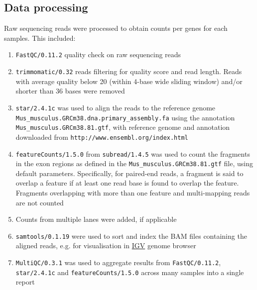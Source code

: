 \documentclass[12pt]{article}
\newcommand{\fastqc}{\texttt{FastQC/0.11.2}}
\newcommand{\trimmomatic}{\texttt{trimmomatic/0.32}}
\renewcommand{\star}{\texttt{star/2.4.1c}}
\newcommand{\refGenome}{\texttt{Mus\_musculus.GRCm38.\-dna.primary\_assembly.fa}}
\newcommand{\refAnnotation}{\texttt{Mus\_musculus.GRCm38.81.gtf}}
\newcommand{\refSource}{\texttt{http://www.ensembl.org/index.html}}
\newcommand{\featureCounts}{\texttt{featureCounts/1.5.0}}
\newcommand{\subread}{\texttt{subread/1.4.5}}
\newcommand{\samtools}{\texttt{samtools/0.1.19}}
\newcommand{\multiqc}{\texttt{MultiQC/0.3.1}}
\begin{document}
\subsection{Data processing}
Raw sequencing reads were processed to obtain counts per genes for each samples. This included: 
\begin{enumerate}
  \item {\fastqc} quality check on raw sequencing reads
  \item {\trimmomatic} reads filtering for quality score and read length. Reads with average quality below 20 (within 4-base wide sliding window) and/or shorter than 36 bases were removed
  \item {\star} was used to align the reads to the reference genome {\refGenome} using the annotation {\refAnnotation}, with reference genome and annotation downloaded from {\refSource}
  \item {\featureCounts} from {\subread} was used to count the fragments in the exon regions as defined in the {\refAnnotation} file, using default parameters. Specifically, for paired-end reads, a fragment is said to overlap a feature if at least one read base is found to overlap the feature. Fragments overlapping with more than one feature and multi-mapping reads are not counted
  \item Counts from multiple lanes were added, if applicable
  \item {\samtools} were used to sort and index the BAM files containing the aligned reads, e.g. for visualisation in \href{https://www.broadinstitute.org/igv/}{IGV} genome browser 
  \item {\multiqc} was used to aggregate results from {\fastqc}, {\star} and {\featureCounts} across many samples into a single report
\end{enumerate}
\end{document}
